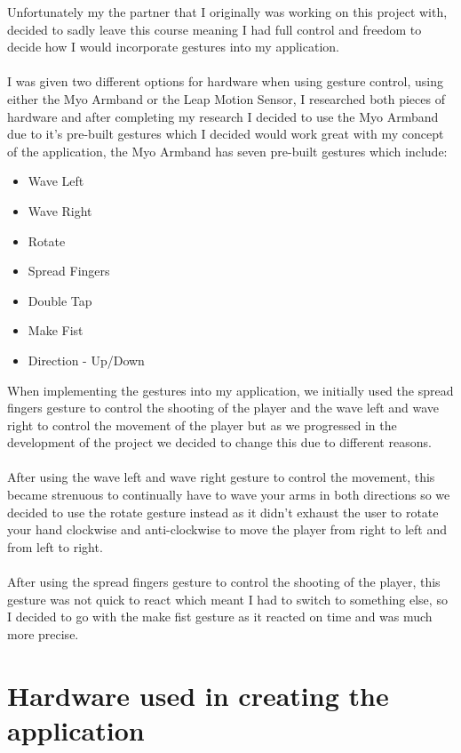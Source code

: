 \documentclass{article}
\begin{document}
Unfortunately my the partner that I originally was working on this project with, decided to sadly leave this course meaning I had full control and freedom to decide how I would incorporate gestures into my application.\\ \\
I was given two different options for hardware when using gesture control, using either the Myo Armband or the Leap Motion Sensor, I researched both pieces of hardware and after completing my research I decided to use the Myo Armband due to it's pre-built gestures which I decided would work great with my concept of the application, the Myo Armband has seven pre-built gestures which include:

\begin{itemize}
    \item Wave Left
    \item Wave Right
    \item Rotate
    \item Spread Fingers
    \item Double Tap
    \item Make Fist
    \item Direction - Up/Down
\end{itemize}
When implementing the gestures into my application, we initially used the spread fingers gesture to control the shooting of the player and the wave left and wave right to control the movement of the player but as we progressed in the development of the project we decided to change this due to different reasons.\\ \\
After using the wave left and wave right gesture to control the movement, this became strenuous to continually have to wave your arms in both directions so we decided to use the rotate gesture instead as it didn't exhaust the user to rotate your hand clockwise and anti-clockwise to move the player from right to left and from left to right.\\ \\
After using the spread fingers gesture to control the shooting of the player, this gesture was not quick to react which meant I had to switch to something else, so I decided to go with the make fist gesture as it reacted on time and was much more precise.

\section{Hardware used in creating the application}
\end{document}
